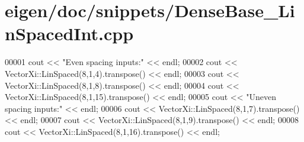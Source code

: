 \hypertarget{eigen_2doc_2snippets_2_dense_base___lin_spaced_int_8cpp_source}{}\section{eigen/doc/snippets/\+Dense\+Base\+\_\+\+Lin\+Spaced\+Int.cpp}
\label{eigen_2doc_2snippets_2_dense_base___lin_spaced_int_8cpp_source}

\begin{DoxyCode}
00001 cout << \textcolor{stringliteral}{"Even spacing inputs:"} << endl;
00002 cout << VectorXi::LinSpaced(8,1,4).transpose() << endl;
00003 cout << VectorXi::LinSpaced(8,1,8).transpose() << endl;
00004 cout << VectorXi::LinSpaced(8,1,15).transpose() << endl;
00005 cout << \textcolor{stringliteral}{"Uneven spacing inputs:"} << endl;
00006 cout << VectorXi::LinSpaced(8,1,7).transpose() << endl;
00007 cout << VectorXi::LinSpaced(8,1,9).transpose() << endl;
00008 cout << VectorXi::LinSpaced(8,1,16).transpose() << endl;
\end{DoxyCode}
